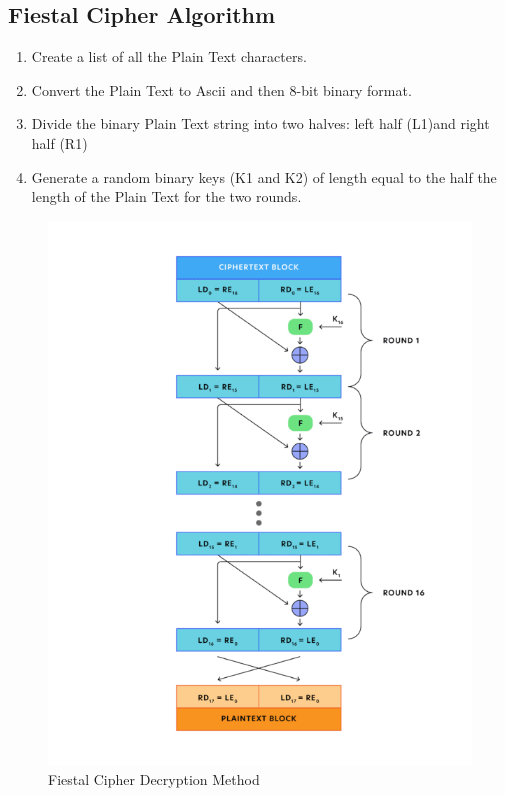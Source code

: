 \documentclass[11pt]{article}
\begin{document}
\subsection{Fiestal Cipher Algorithm}

\begin{enumerate}
	\item Create a list of all the Plain Text characters.

	\item Convert the Plain Text to Ascii and then 8-bit binary format.

	\item Divide the binary Plain Text string into two halves: left half (L1)and right half (R1)

	\item Generate a random binary keys (K1 and K2) of length equal to the half the length of the Plain Text for the two rounds.

\end{enumerate}

\begin{figure}[H]
	\centering
	\includegraphics[scale=0.5]{fiestal_cipher.png}
	\caption{Fiestal Cipher Decryption Method}
\end{figure}
\end{document}
